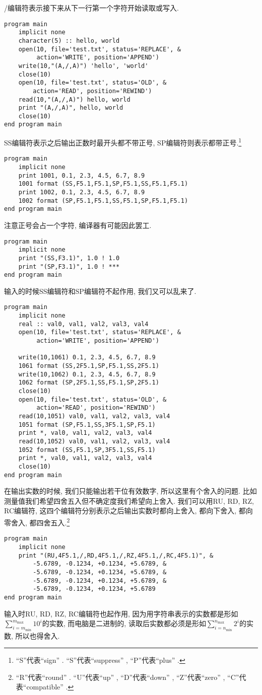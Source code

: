 /编辑符表示接下来从下一行第一个字符开始读取或写入.
\begin{lstlisting}
program main
    implicit none
    character(5) :: hello, world
    open(10, file='test.txt', status='REPLACE', &
         action='WRITE', position='APPEND')
    write(10,"(A,/,A)") 'hello', 'world'
    close(10)
    open(10, file='test.txt', status='OLD', &
        action='READ', position='REWIND')
    read(10,"(A,/,A)") hello, world
    print "(A,/,A)", hello, world
    close(10)
end program main
\end{lstlisting}

SS编辑符表示之后输出正数时最开头都不带正号, SP编辑符则表示都带正号.\footnote{``S''代表``sign'' . ``S''代表``suppress'' , ``P''代表``plus'' .}
\begin{lstlisting}
program main
    implicit none
    print 1001, 0.1, 2.3, 4.5, 6.7, 8.9
    1001 format (SS,F5.1,F5.1,SP,F5.1,SS,F5.1,F5.1)
    print 1002, 0.1, 2.3, 4.5, 6.7, 8.9
    1002 format (SP,F5.1,F5.1,SS,F5.1,SP,F5.1,F5.1)
end program main
\end{lstlisting}
注意正号会占一个字符, 编译器有可能因此罢工.
\begin{lstlisting}
program main
    implicit none
    print "(SS,F3.1)", 1.0 ! 1.0
    print "(SP,F3.1)", 1.0 ! ***
end program main
\end{lstlisting}
输入的时候SS编辑符和SP编辑符不起作用, 我们又可以乱来了.
\begin{lstlisting}
program main
    implicit none
    real :: val0, val1, val2, val3, val4
    open(10, file='test.txt', status='REPLACE', &
         action='WRITE', position='APPEND')

    write(10,1061) 0.1, 2.3, 4.5, 6.7, 8.9
    1061 format (SS,2F5.1,SP,F5.1,SS,2F5.1)
    write(10,1062) 0.1, 2.3, 4.5, 6.7, 8.9
    1062 format (SP,2F5.1,SS,F5.1,SP,2F5.1)
    close(10)
    open(10, file='test.txt', status='OLD', &
         action='READ', position='REWIND')
    read(10,1051) val0, val1, val2, val3, val4
    1051 format (SP,F5.1,SS,3F5.1,SP,F5.1)
    print *, val0, val1, val2, val3, val4
    read(10,1052) val0, val1, val2, val3, val4
    1052 format (SS,F5.1,SP,3F5.1,SS,F5.1)
    print *, val0, val1, val2, val3, val4
    close(10)
end program main
\end{lstlisting}

在输出实数的时候, 我们只能输出若干位有效数字, 所以这里有个舍入的问题. 比如测量值我们希望四舍五入但不确定度我们希望向上舍入. 我们可以用RU, RD, RZ, RC编辑符, 这四个编辑符分别表示之后输出实数时都向上舍入, 都向下舍入, 都向零舍入, 都四舍五入.\footnote{``R''代表``round'' . ``U''代表``up'' , ``D''代表``down'' , ``Z''代表``zero'' , ``C''代表``compatible'' .}
\begin{lstlisting}
program main
    implicit none
    print "(RU,4F5.1,/,RD,4F5.1,/,RZ,4F5.1,/,RC,4F5.1)", &
        -5.6789, -0.1234, +0.1234, +5.6789, &
        -5.6789, -0.1234, +0.1234, +5.6789, &
        -5.6789, -0.1234, +0.1234, +5.6789, &
        -5.6789, -0.1234, +0.1234, +5.6789
end program main
\end{lstlisting}
输入时RU, RD, RZ, RC编辑符也起作用, 因为用字符串表示的实数都是形如$\sum_{i=m_\text{min}}^{m_\text{max}}10^{i}$的实数, 而电脑是二进制的, 读取后实数都必须是形如$\sum_{i=n_\text{min}}^{n_\text{max}}2^{i}$的实数, 所以也得舍入.


